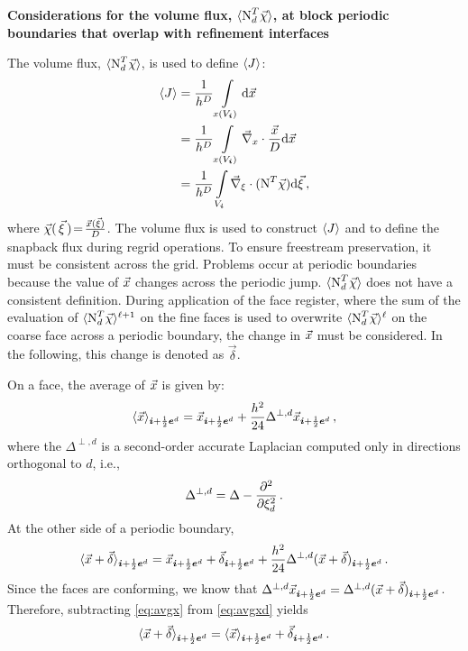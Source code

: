 \ifx\havefulldoc\undefined
  
  
\fi

\begin{center}
  \large\bfseries Considerations for the volume flux, $\langle {\text{N}}^T_d\vec{\chi}\rangle$, at block periodic boundaries that overlap with refinement interfaces
\end{center}

The volume flux, $\langle {\text{N}}^T_d \vec{\chi}\rangle$, is used to define $\langle J\rangle$:
\begin{align*}
  \langle J\rangle &= \frac{1}{h^D} \int \limits_{x(V_{\boldsymbol{i}})} \mathrm{d} {\vec{x}}\\
          &= \frac{1}{h^D} \int \limits_{x(V_{\boldsymbol{i}})} {\vec{\nabla}}_x \cdot \frac{{\vec{x}}}{D} \mathrm{d} {\vec{x}}\\
          &= \frac{1}{h^D} \int \limits_{V_{\boldsymbol{i}}} {\vec{\nabla}}_{{\xi}} \cdot ({\text{N}}^T\vec{\chi}) \mathrm{d} {\vec{\xi}}\,,
\end{align*}
where $\vec{\chi}(\,{\vec{\xi}}\,)\!=\! \frac{{\vec{x}}({\vec{\xi}})}{D}$.  The volume flux is used to construct $\langle J\rangle$ and to define the snapback flux during regrid operations.  To ensure freestream preservation, it must be consistent across the grid.  Problems occur at periodic boundaries because the value of ${\vec{x}}$ changes across the periodic jump.  $\langle {\text{N}}^T_d\vec{\chi}\rangle$ does not have a consistent definition.  During application of the face register, where the sum of the evaluation of $\langle {\text{N}}^T_d\vec{\chi}\rangle^{\ell+1}$ on the fine faces is used to overwrite $\langle {\text{N}}^T_d{\vec{\chi}}\rangle^{\ell}$ on the coarse face across a periodic boundary, the change in ${\vec{x}}$ must be considered.  In the following, this change is denoted as $\vec{\delta}$.

On a face, the average of ${\vec{x}}$ is given by:
\begin{equation}
  \langle {\vec{x}}\rangle_{{{\boldsymbol{i}}+\frac{1}{2}{{\boldsymbol{e}}^d}}} = {\vec{x}}_{{{\boldsymbol{i}}+\frac{1}{2}{{\boldsymbol{e}}^d}}} + \frac{h^2}{24} \Delta^{\perp,d} {{\vec{x}}}_{{{\boldsymbol{i}}+\frac{1}{2}{{\boldsymbol{e}}^d}}}\,,
  \label{eq:avgx}
\end{equation}
where the $\Delta^{\perp,d}$ is a second-order accurate Laplacian computed only in directions orthogonal to $d$, i.e.,
\begin{equation}
  \Delta^{\perp,d} = \Delta - \fpartial{}{\xi_d}{2}\,. \nonumber
\end{equation}
At the other side of a periodic boundary,
\begin{equation}
  \langle {\vec{x}} + \vec{\delta}\rangle_{{{\boldsymbol{i}}+\frac{1}{2}{{\boldsymbol{e}}^d}}} = {\vec{x}}_{{{\boldsymbol{i}}+\frac{1}{2}{{\boldsymbol{e}}^d}}} + \vec{\delta}_{{{\boldsymbol{i}}+\frac{1}{2}{{\boldsymbol{e}}^d}}} + \frac{h^2}{24} \Delta^{\perp,d} ({\vec{x}} + \vec{\delta})_{{{\boldsymbol{i}}+\frac{1}{2}{{\boldsymbol{e}}^d}}}\,.
  \label{eq:avgxd}
\end{equation}
Since the faces are conforming, we know that $\Delta^{\perp,d} {{\vec{x}}}_{{{\boldsymbol{i}}+\frac{1}{2}{{\boldsymbol{e}}^d}}} = \Delta^{\perp,d} ({\vec{x}} + \vec{\delta})_{{{\boldsymbol{i}}+\frac{1}{2}{{\boldsymbol{e}}^d}}}$.  Therefore, subtracting \eqref{eq:avgx} from \eqref{eq:avgxd} yields
\begin{equation}
\langle {\vec{x}} + \vec{\delta}\rangle_{{{\boldsymbol{i}}+\frac{1}{2}{{\boldsymbol{e}}^d}}} = \langle {\vec{x}}\rangle_{{{\boldsymbol{i}}+\frac{1}{2}{{\boldsymbol{e}}^d}}} + \vec{\delta}_{{{\boldsymbol{i}}+\frac{1}{2}{{\boldsymbol{e}}^d}}}\,.
\end{equation}

